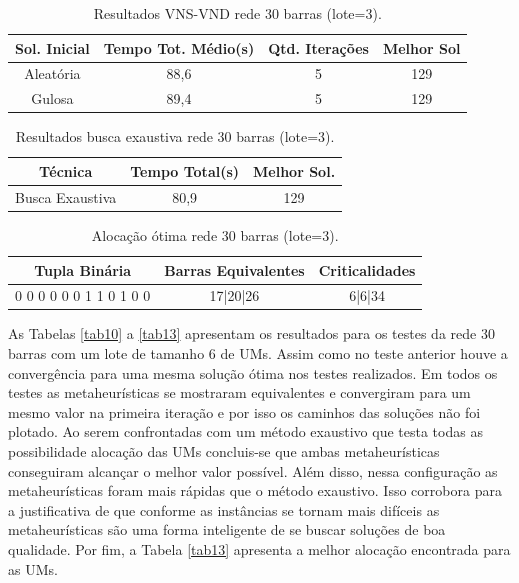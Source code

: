 \documentclass[12pt]{article}
\begin{document}
\begin{table}[H]
	\centering
	\caption{Resultados VNS-VND rede 30 barras (lote=3).}
	\begin{tabular}{|c|c|c|c|}
		\hline
		\textbf{Sol. Inicial} & \textbf{Tempo Tot. Médio(s)} & \textbf{Qtd. Iterações} & \textbf{Melhor Sol} \\
		\hline
		Aleatória & 88,6  & 5     & 129 \\
		\hline
		Gulosa & 89,4  & 5     & 129 \\
		\hline
	\end{tabular}%
	\label{tab7}%
\end{table}%


\begin{table}[H]
	\centering
	\caption{Resultados busca exaustiva rede 30 barras (lote=3).}
	\begin{tabular}{|c|c|c|}
		\hline
		\textbf{Técnica} & \textbf{Tempo Total(s)} & \textbf{Melhor Sol.} \\
		\hline
		Busca Exaustiva & 80,9  & 129 \\
		\hline
	\end{tabular}%
	\label{tab8}%
\end{table}%

\begin{table}[H]
	\centering
	\caption{Alocação ótima rede 30 barras (lote=3).}
	\begin{tabular}{|l|c|c|}
		\hline
		\multicolumn{1}{|c|}{\textbf{Tupla Binária}} & \textbf{Barras Equivalentes} & \multicolumn{1}{l|}{\textbf{Criticalidades}} \\
		\hline
		0 0 0 0 0 0 1 1 0 1 0 0 & 17|20|26 & 6|6|34 \\
		\hline
	\end{tabular}%
	\label{tab9}%
\end{table}%

As Tabelas \ref{tab10} a \ref{tab13} apresentam os resultados para os testes da rede 30 barras com um lote de tamanho 6 de UMs. Assim como no teste anterior houve a convergência para uma mesma solução ótima nos testes realizados. Em todos os testes as metaheurísticas se mostraram equivalentes e convergiram para um mesmo valor na primeira iteração e por isso os caminhos das soluções não foi plotado. Ao serem confrontadas com um método exaustivo que testa todas as possibilidade alocação das UMs concluis-se que ambas metaheurísticas conseguiram alcançar o melhor valor possível. Além disso, nessa configuração as metaheurísticas foram mais rápidas que o método exaustivo. Isso corrobora para a justificativa de que conforme as instâncias se tornam mais difíceis as metaheurísticas são uma forma inteligente de se buscar soluções de boa qualidade. Por fim, a Tabela \ref{tab13} apresenta a melhor alocação encontrada para as UMs.
\end{document}
